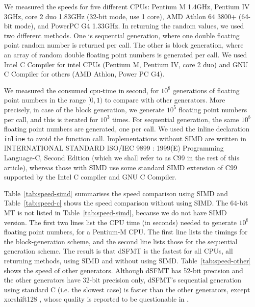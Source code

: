 \documentclass{svmult}
\begin{document}
We measured the speeds for five different CPUs: Pentium M 1.4GHz,
Pentium IV 3GHz, core 2 duo 1.83GHz (32-bit mode, use 1 core), AMD
Athlon 64 3800+ (64-bit mode), and PowerPC G4 1.33GHz.  In returning
the random values, we used two different methods.  One is sequential
generation, where one double floating point random number is returned
per call.  The other is block generation, where an array of random
double floating point numbers is generated per call.  We used
Intel C Compiler for intel CPUs (Pentium M, Pentium IV, core 2 duo)
and GNU C Compiler for others (AMD Athlon, Power PC G4).

We measured the consumed cpu-time in second, for $10^8$ generations of
floating point numbers in the range $[0, 1)$ to compare with other
generators.  More precisely, in case of the block generation, we
generate $10^5$ floating point numbers per call, and this is
iterated for $10^3$ times.  For sequential generation, the same $10^8$
floating point numbers are generated, one per call.  We used
the inline declaration {\tt inline} to avoid the function call.
Implementations without SIMD are written in INTERNATIONAL STANDARD
ISO/IEC 9899 : 1999(E) Programming Language-C, Second Edition (which
we shall refer to as C99 in the rest of this article), whereas those
with SIMD use some standard SIMD extension of C99 supported by the
Intel C compiler and GNU C Compiler.

Table~\ref{tab:speed-simd} summarises the speed comparison using SIMD
and Table~\ref{tab:speed-c} shows the speed comparison without using
SIMD.  The 64-bit MT is not listed in Table~\ref{tab:speed-simd}, because
we do not have SIMD version.  The first two lines list the CPU time (in
seconds) needed to generate $10^8$ floating point numbers, for a
Pentium-M CPU.  The first line lists the timings for the
block-generation scheme, and the second line lists those for the
sequential generation scheme. 
The result is that dSFMT is the fastest for all CPUs, all
returning methods, using SIMD and without using SIMD.
Table~\ref{tab:speed-other} shows the speed of other
generators. Although
dSFMT has 52-bit precision and the other generators have 32-bit
precision only, dSFMT's sequential generation using standard
C (i.e. the slowest case) is faster than the other generators, except xorshift128
\cite{XORSHIFT-MAR}, whose quality is reported to be questionable 
in \cite{XORSHIFT-LEcuyer}.
\end{document}
